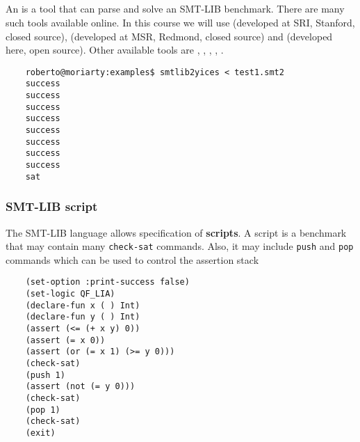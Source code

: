 \subsection{\smtsolvers}

\begin{frame}[fragile]
  \frametitle{\smtsolvers}

  An \smtsolver is a tool that can parse and solve an SMT-LIB
  benchmark.
  \vfill
  \pause
  There are many such tools available online. In this course
  we will use \yices (developed at SRI, Stanford, closed source), \zthree 
  (developed at MSR, Redmond, closed source) and \opensmt (developed here, open source). \pause
  Other available tools are \mathsat, \cvcfour, \boolector, \verit, \stp.
  \vfill
  \pause
  {\scriptsize
  \begin{verbatim}
    roberto@moriarty:examples$ smtlib2yices < test1.smt2 
    success
    success
    success
    success
    success
    success
    success
    success
    sat
  \end{verbatim}  
  }

\end{frame}

\begin{frame}[fragile]
  \frametitle{SMT-LIB script}

  The SMT-LIB language allows specification of {\bf scripts}. A script
  is a benchmark that may contain many {\tt check-sat} commands. Also, 
  it may include {\tt push} and {\tt pop} commands which
  can be used to control the assertion stack

  {\scriptsize
  \begin{verbatim}
    (set-option :print-success false)
    (set-logic QF_LIA)
    (declare-fun x ( ) Int)
    (declare-fun y ( ) Int)
    (assert (<= (+ x y) 0))
    (assert (= x 0))
    (assert (or (= x 1) (>= y 0)))
    (check-sat)
    (push 1)
    (assert (not (= y 0)))
    (check-sat)
    (pop 1)
    (check-sat)
    (exit)
  \end{verbatim} 
  }

\end{frame}

